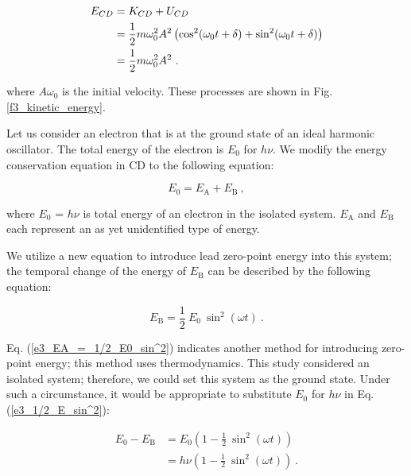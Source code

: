\documentclass[%
 reprint,
 amsmath,amssymb,
 aps,
]{revtex4-1}
\numberwithin{equation}{section}%
\begin{document}
        \begin{align}
            E_{CD}
                &= K_{CD} + U_{CD}    \notag \\
                &= \frac{1}{2} m \omega_{0}^{2} A^{2} \left( \cos^{2} (\omega_{0} t + \delta) + \sin^{2}(\omega_{0} t +\delta) \right)    \notag \\
                &= \frac{1}{2} m \omega_{0}^{2} A^{2}
                \ .
        \end{align}

    \noindent
    where $A \omega_{0}$ is the initial velocity. These processes are shown in Fig. \ref{f3_kinetic_energy}.

    Let us consider an electron that is at the ground state of an ideal harmonic oscillator. The total energy of the electron is $E_{0}$ for $h \nu$. We modify the energy conservation equation in CD to the following equation:

        \begin{equation}
            E_{0} = E_{\mathrm{A}} + E_{\mathrm{B}}
            \ ,
            \label{e3_EA+EB}
        \end{equation}

    \noindent
    where $E_{0}$ = $h \nu$ is total energy of an electron in the isolated system. $E_{\mathrm{A}}$ and $E_{\mathrm{B}}$ each represent an as yet unidentified type of energy.
    
    We utilize a new equation to introduce lead zero-point energy into this system; the temporal change of the energy of $E_{\mathrm{B}}$ can be described by the following equation:

        \begin{equation}
            E_{\mathrm{B}} = \frac{1}{2} \ E_{0} \ \sin^{2} (\omega t)
            \ .
            \label{e3_EA_=_1/2_E0_sin^2}
        \end{equation}

    Eq. (\ref{e3_EA_=_1/2_E0_sin^2}) indicates another method for introducing zero-point energy; this method uses thermodynamics. This study considered an isolated system; therefore, we could set this system as the ground state. Under such a circumstance, it would be appropriate to substitute $E_{0}$ for $h\nu$ in Eq. (\ref{e3_1/2_E_sin^2}):
        
        \begin{equation}
            \begin{split}
                E_{0} - E_{\mathrm{B}} 
                    &=  E_{0} \left(1 - \frac{1}{2} \ \sin^{2} (\omega t) \right) \\
                    &=  h\nu \left(1 - \frac{1}{2} \ \sin^{2} (\omega t) \right)
                    \ .
                    \label{e3_1/2_E_sin^2}
            \end{split}
        \end{equation}
\end{document}
